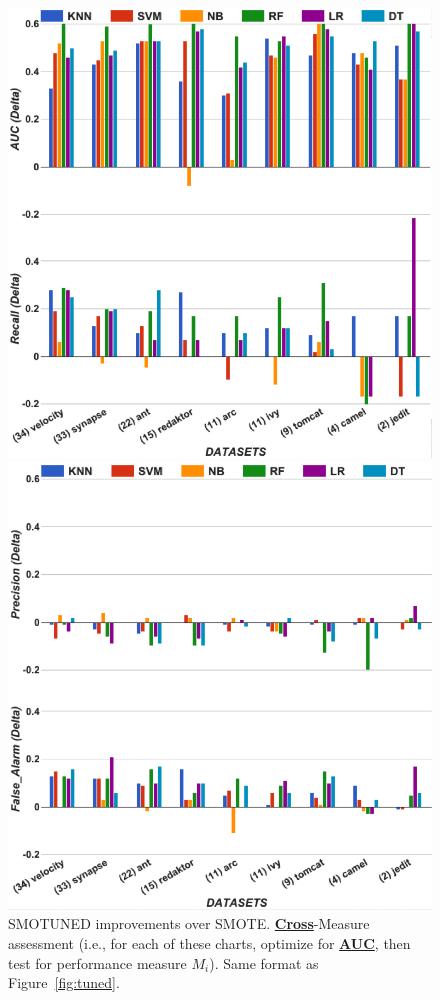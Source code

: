 \documentclass[sigconf]{acmart}
\theoremstyle{break}
\begin{document}
\begin{figure}[!t]
\begin{minipage}{.5\linewidth}
\centering
        \includegraphics[width=.75\linewidth,keepaspectratio,trim=1cm 1cm 1cm 0cm]{./fig/AUC_auc1.png}
    \end{minipage}%
\begin{minipage}{.5\linewidth}
        \centering
        \includegraphics[width=.75\linewidth,keepaspectratio,trim=1cm 1cm 1cm 0cm]{./fig/AUC_prec.png}
    \end{minipage}%
    
    \caption{ SMOTUNED improvements over SMOTE. 
    \underline{{\bf Cross}}-Measure
    assessment (i.e., for each of these charts,
    optimize for \underline{{\bf AUC}}, then test for
    performance measure $M_i$).  Same format as
    Figure~\ref{fig:tuned}.}
    \label{fig:auc22}
\end{figure}
\end{document}
